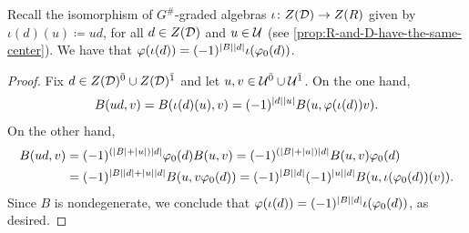 \begin{prop}\label{prop:R-and-D-have-the-same-center-vphi}
	Recall the isomorphism of $G^\#$-graded algebras $\iota\colon Z(\mathcal{D}) \to Z(R)$ given by $\iota (d)(u) \coloneqq ud$, for all $d\in Z(\mathcal{D})$ and $u\in \mathcal U$ (see \cref{prop:R-and-D-have-the-same-center}). 
	We have that $\varphi (\iota (d)) = (-1)^{|B||d|} \iota (\varphi_0(d))$. 
\end{prop}

\begin{proof}
	Fix $d\in Z(\mathcal{D})^{\bar0} \cup Z(\mathcal{D})^{\bar1}$ and let $u, v \in \mathcal U^{\bar0} \cup \mathcal U^{\bar1}$.
	On the one hand,
	\begin{align*}
		B(ud,v) = B(\iota (d)(u), v) = (-1)^{|d||u|} B(u, \varphi(\iota (d)) v).
	\end{align*}
	On the other hand,
	\begin{align*}
		B(ud, v) &= (-1)^{(|B| + |u|) |d|} \varphi_0(d) B(u, v) = (-1)^{(|B| + |u|) |d|} B(u, v) \varphi_0(d)     \\
		 & = (-1)^{|B||d| + |u||d|} B(u, v \varphi_0(d) ) 
		 = (-1)^{|B||d|} (-1)^{|u||d|} B(u, \iota (\varphi_0(d))(v)). 
	\end{align*}
	Since $B$ is nondegenerate, we conclude that $\varphi (\iota (d)) = (-1)^{|B||d|} \iota (\varphi_0(d))$, as desired. 
\end{proof}

